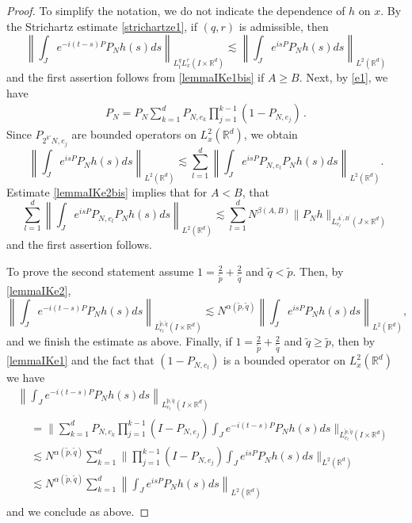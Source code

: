 \documentclass[10pt,leqno]{amsart}
\newcommand{\R}{\mathbb{R}}
\numberwithin{equation}{section}
\begin{document}
\begin{proof}
To simplify the notation, we do not indicate the dependence of $h$ on $x$. 
By the Strichartz estimate \eqref{strichartze1}, if $(q,r)$ is admissible, then
$$\left\|\int_J e^{-i(t-s) P} P_N h(s) ds\right\|_{L_t^q L_x^r (I\times \R^d)} \lesssim \left\|\int_J e^{is P } P_N h(s) ds\right\|_{L^2 (\R^d)} $$
and the first assertion follows from \eqref{lemmaIKe1bis} if $A \geq B$.
Next, by \eqref{e1}, we have
\begin{align*}
P_N 
= P_{N} \sum_{k = 1}^d P_{N, e_k} \prod_{j = 1}^{k - 1}(1 - P_{N, e_j}) \,.
\end{align*}
Since $P_{2^{k'}N,e_j}$ are bounded operators on $L^2_x (\R^d )$, we obtain  
$$
\left\|\int_J e^{is P } P_N h(s) ds\right\|_{L^2 (\R^d )} \lesssim \sum^{d}_{l=1}\left\|\int_J e^{is P} P_{N,e_l} P_N h(s) ds\right\|_{L^2 (\R^d )}.
$$
 Estimate \eqref{lemmaIKe2bis} implies that for $ A < B$, that 
$$\sum_{l=1}^d  \left\|\int_J e^{is P} P_{N,e_l} P_N h(s) ds \right\|_{L^2 (\R^d )} \lesssim \sum_{l=1}^d N^{\beta (A,B)} \|P_N h\|_{L_{e_l}^{A^\prime ,B^\prime} (J\times \R^d )}$$
and the first assertion follows. 


To prove the second statement assume $1= \frac{2}{\tilde{p}} +\frac{2}{\tilde{q}}$ and $\tilde{q} < \tilde{p}$. Then, by 
\eqref{lemmaIKe2}, 
\begin{equation}
\label{line1}
\left\|\int_J e^{-i(t-s) P} P_N h(s) ds \right\|_{L_{e_l}^{\tilde p, \tilde q} (I\times \R^d)}\lesssim N^{\alpha ( \tilde{p},\tilde q)}  \left\|\int_J e^{is P } P_N h(s) ds \right \|_{L^2 (\R^d)} ,
\end{equation}
and we finish the estimate as above. Finally, if $1= \frac{2}{\tilde{p}} +\frac{2}{\tilde{q}}$ and $\tilde{q} \geq \tilde{p}$, then by \eqref{lemmaIKe1} and the fact that $(1-P_{N,e_l})$ is a bounded operator on $L^2_x (\R^d )$ we have 
\begin{multline*}
\left\|\int_J e^{-i(t-s) P} P_N h(s) ds \right\|_{L_{e_l}^{\tilde p, \tilde q} (I\times \R^d)} \\
\begin{aligned}
&=  \Bigg\| \sum_{k = 1}^d P_{N, e_k} \prod_{j = 1}^{k-1} (I - P_{N, e_{j}}) \int_J e^{-i(t -s) P } P_N h(s) ds \Bigg\|_{L_{e_l}^{\tilde p, \tilde q} (I\times \R^d)} \\
&\lesssim N^{\alpha ( \tilde{p},\tilde q)} \sum_{k = 1}^d  \bigg\|  \prod_{j = 1}^{k-1} (I - P_{N, e_{j}}) \int_J e^{is P } P_N h(s) ds \bigg \|_{L^2 (\R^d)} \\
&\lesssim N^{\alpha ( \tilde{p},\tilde q)} \sum_{k = 1}^d  \left\| \int_J e^{is P } P_N h(s) ds \right \|_{L^2 (\R^d)}
\end{aligned}
\end{multline*}
and we conclude as above. 
\end{proof}
\end{document}
